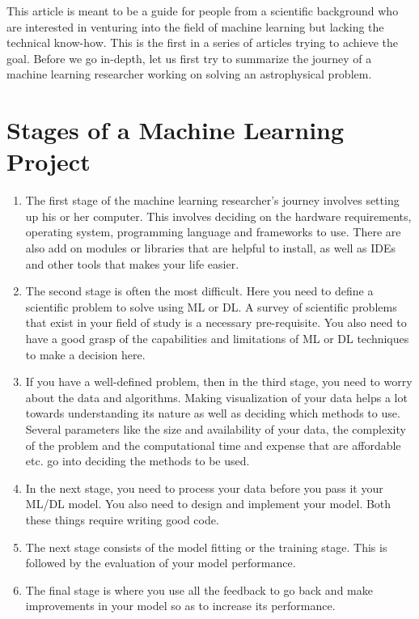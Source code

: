 \documentclass{../template/texnote}
\title{\textbf{\capitalisewords{Guide to Practical Machine Learning for Astronomy - Part I}}}%
\begin{document}
    \maketitle {}

This article is meant to be a guide for people from a scientific background who are interested in venturing into the field of machine learning but lacking the technical know-how. This is the first in a series of articles trying to achieve the goal. Before we go in-depth, let us first try to summarize the journey of a machine learning researcher working on solving an astrophysical problem. 

\section{Stages of a Machine Learning Project}
\begin{enumerate}
    \item The first stage of the machine learning researcher's journey involves setting up his or her computer. This involves deciding on the hardware requirements, operating system, programming language and frameworks to use. There are also add on modules or libraries that are helpful to install, as well as IDEs and other tools that makes your life easier.
    \item The second stage is often the most difficult. Here you need to define a scientific problem to solve using ML or DL. A survey of scientific problems that exist in your field of study is a necessary pre-requisite. You also need to have a good grasp of the capabilities and limitations of ML or DL techniques to make a decision here.
    \item If you have a well-defined problem,  then in the third stage, you need to worry about the data and algorithms. Making visualization of your data helps a lot towards understanding its nature as well as deciding which methods to use. Several parameters like the size and availability of your data, the complexity of the problem and the computational time and expense that are affordable etc. go into deciding the methods to be used. 
    \item In the next stage, you need to process your data before you pass it your ML/DL model. You also need to design and implement your model. Both these things require writing good code.
    \item The next stage consists of the model fitting or the training stage. This is followed by the evaluation of your model performance. 
    \item The final stage is where you use all the feedback to go back and make improvements in your model so as to increase its performance. 
\end{enumerate}
\end{document}
